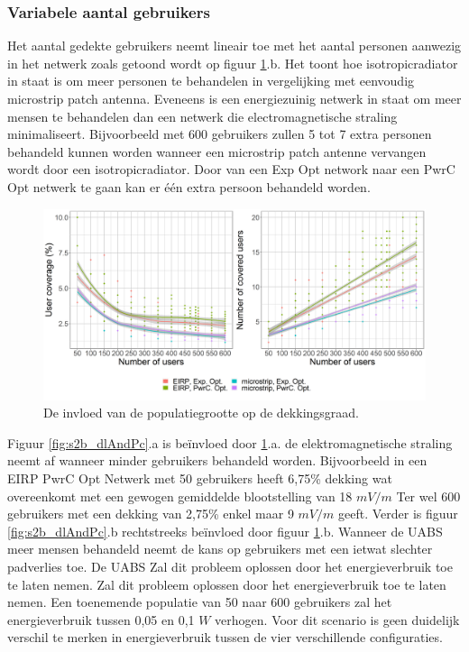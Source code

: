 \documentclass[twocolumn]{phdsymp_dutch}
\begin{document}
\subsubsection{Variabele aantal gebruikers}
Het aantal gedekte gebruikers neemt lineair toe met het aantal personen aanwezig in het netwerk zoals getoond wordt op figuur
\ref{fig:s2uvsnumcovusers}.b. Het toont hoe  \gls{isotropicradiator} in staat is om meer personen te behandelen in vergelijking met eenvoudig
 microstrip patch antenna. Eveneens is een energiezuinig netwerk in staat om meer mensen te behandelen dan een netwerk die electromagnetische straling minimaliseert.
 Bijvoorbeeld met 600 gebruikers zullen 5 tot 7 extra personen behandeld kunnen worden wanneer 
 een microstrip patch antenne vervangen wordt door een  \gls{isotropicradiator}.
Door van een \gls{Exp Opt} network naar een \gls{PwrC Opt} netwerk te gaan kan er \'e\'en extra persoon 
behandeld worden.

\begin{figure}[h!]
  \includegraphics[width=\linewidth]{s2/uvsnumdronesAndCov.png}
  \caption{De invloed van de populatiegrootte op de dekkingsgraad.}
  \label{fig:s2uvsnumcovusers}
\end{figure}

Figuur  \ref{fig:s2b_dlAndPc}.a  is be\"invloed door \ref{fig:s2uvsnumcovusers}.a. 
de elektromagnetische straling neemt af wanneer minder gebruikers behandeld worden.
Bijvoorbeeld in een EIRP \gls{PwrC Opt} Netwerk met 50 gebruikers heeft 6,75\%
dekking wat overeenkomt met een gewogen gemiddelde blootstelling van 18 $mV/m$
Ter wel 600 gebruikers met een dekking van 2,75\% enkel maar 9 $mV/m$ geeft.
Verder is figuur \ref{fig:s2b_dlAndPc}.b rechtstreeks be\"invloed door figuur  \ref{fig:s2uvsnumcovusers}.b.
Wanneer de \gls{UABS} meer mensen behandeld neemt de kans op gebruikers met een ietwat slechter padverlies toe.
De  \gls{UABS} Zal dit probleem oplossen door het energieverbruik toe te laten nemen.
Zal dit probleem oplossen door het energieverbruik toe te laten nemen.
Een toenemende populatie van 50 naar 600 gebruikers zal het energieverbruik tussen 0,05 en 0,1 $W$ verhogen.
Voor dit scenario is geen duidelijk verschil te merken in energieverbruik tussen de vier verschillende configuraties.
\end{document}
